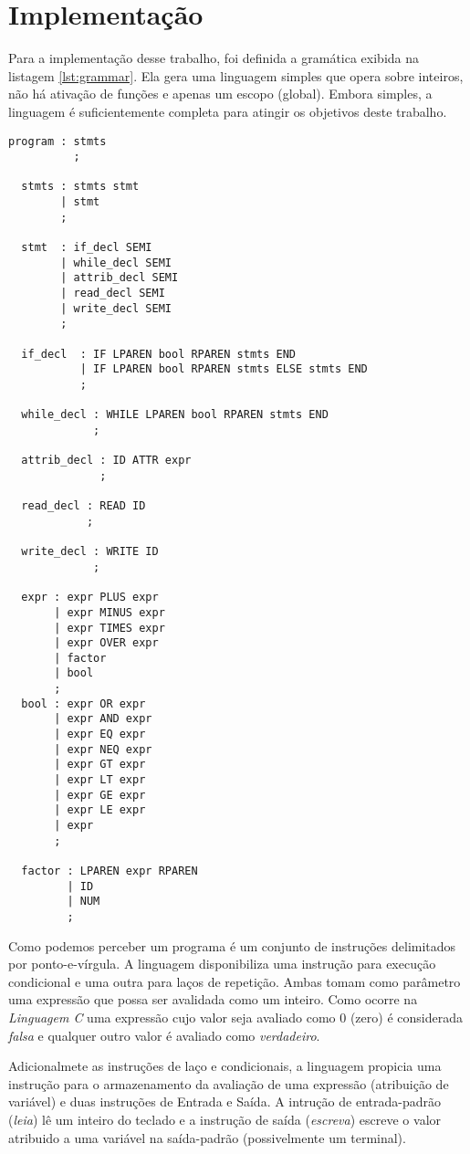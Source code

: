\section{Implementação}
\label{sec:implementacao}

Para a implementação desse trabalho, foi definida a gramática exibida na
listagem \ref{lst:grammar}. Ela gera uma linguagem simples que opera sobre
inteiros, não há ativação de funções e apenas um escopo (global).
Embora simples, a linguagem é suficientemente completa para atingir os
objetivos deste trabalho.

\begin{lstlisting}[label=lst:grammar,caption=Gramática reconhecida]
  program : stmts
          ;

  stmts : stmts stmt
        | stmt
        ;

  stmt  : if_decl SEMI
        | while_decl SEMI
        | attrib_decl SEMI
        | read_decl SEMI
        | write_decl SEMI
        ;

  if_decl  : IF LPAREN bool RPAREN stmts END
           | IF LPAREN bool RPAREN stmts ELSE stmts END
           ;

  while_decl : WHILE LPAREN bool RPAREN stmts END
             ;

  attrib_decl : ID ATTR expr
              ;

  read_decl : READ ID
            ;

  write_decl : WRITE ID
             ;

  expr : expr PLUS expr
       | expr MINUS expr
       | expr TIMES expr
       | expr OVER expr
       | factor
       | bool
       ;
  bool : expr OR expr
       | expr AND expr
       | expr EQ expr
       | expr NEQ expr
       | expr GT expr
       | expr LT expr
       | expr GE expr
       | expr LE expr
       | expr
       ;

  factor : LPAREN expr RPAREN
         | ID
         | NUM
         ;
\end{lstlisting}

Como podemos perceber um programa é um conjunto de instruções delimitados por
ponto-e-vírgula. A linguagem disponibiliza uma instrução para execução
condicional e uma outra para laços de repetição. Ambas tomam como parâmetro
uma expressão que possa ser avalidada como um inteiro. Como ocorre na
\emph{Linguagem C} uma expressão cujo valor seja avaliado como 0 (zero) é
considerada \emph{falsa} e qualquer outro valor é avaliado como
\emph{verdadeiro}.

Adicionalmete as instruções de laço e condicionais, a linguagem propicia uma
instrução para o armazenamento da avaliação de uma expressão (atribuição de
variável) e duas instruções de Entrada e Saída. A intrução de entrada-padrão
(\emph{leia}) lê um inteiro do teclado e a instrução de saída (\emph{escreva})
escreve o valor atribuido a uma variável na saída-padrão (possivelmente um
terminal).

